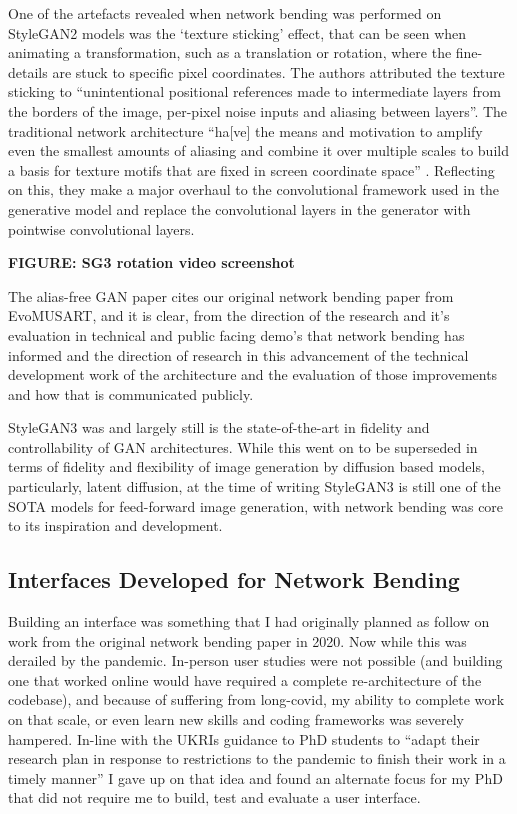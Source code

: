  One of the artefacts revealed when network bending was performed on StyleGAN2 models was the ‘texture sticking’ effect, that can be seen when animating a transformation, such as a translation or rotation, where the fine-details are stuck to specific pixel coordinates. 
 The authors attributed the texture sticking to “unintentional positional references made to intermediate layers from the borders of the image, per-pixel noise inputs and aliasing between layers”. 
 The traditional network architecture “ha[ve] the means and motivation to amplify even the smallest amounts of aliasing and combine it over multiple scales to build a basis for texture motifs that are fixed in screen coordinate space” \citep{karras2021alias}.
 Reflecting on this, they make a major overhaul to the convolutional framework used in the generative model and replace the convolutional layers in the generator with pointwise convolutional layers.

 \textbf{FIGURE: SG3 rotation video screenshot}

 The alias-free GAN paper cites our original network bending paper from EvoMUSART, and it is clear, from the direction of the research and it’s evaluation in technical and public facing demo’s that network bending has informed and the direction of research in this advancement of the technical development work of the architecture and the evaluation of those improvements and how that is communicated publicly. 

StyleGAN3 was and largely still is the state-of-the-art in fidelity and controllability of GAN architectures. 
While this went on to be superseded in terms of fidelity and flexibility of image generation by diffusion based models, particularly, latent diffusion, at the time of writing StyleGAN3 is still one of the SOTA models for feed-forward image generation, with network bending was core to its inspiration and development. 

\subsection{Interfaces Developed for Network Bending}

Building an interface was something that I had originally planned as follow on work from the original network bending paper in 2020. 
Now while this was derailed by the pandemic. In-person user studies were not possible (and building one that worked online would have required a complete re-architecture of the codebase), and because of suffering from long-covid, my ability to complete work on that scale, or even learn new skills and coding frameworks was severely hampered. 
In-line with the UKRIs guidance to PhD students to “adapt their research plan in response to restrictions to the pandemic to finish their work in a timely manner” I gave up on that idea and found an alternate focus for my PhD that did not require me to build, test and evaluate a user interface. 

